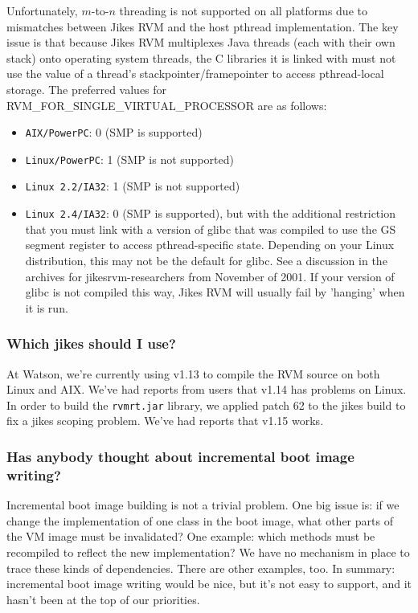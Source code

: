 Unfortunately, $m$-to-$n$ threading is not supported on all platforms due to
mismatches between Jikes RVM  and the host pthread implementation.  
The key issue is that because Jikes RVM multiplexes Java threads
(each with their own stack) onto operating system threads, the
C libraries it is linked with must not use the value of a thread's
stackpointer/framepointer to access pthread-local storage.  The
preferred values for RVM\_FOR\_SINGLE\_VIRTUAL\_PROCESSOR are as
follows: 
\begin{itemize}
\item {\tt AIX/PowerPC}: 0 (SMP is supported)
\item {\tt Linux/PowerPC}:  1 (SMP is not supported)
\item {\tt Linux 2.2/IA32}: 1 (SMP is not supported)
\item {\tt Linux 2.4/IA32}: 0 (SMP is supported), but with the
additional restriction that you must link with a version of glibc that
was compiled to use the GS segment register to access pthread-specific
state.  Depending on your Linux distribution, this may not be the
default for glibc. See a discussion in the archives for
jikesrvm-researchers from November of 2001. If your version of glibc
is not compiled this way, Jikes RVM  will usually fail by 'hanging' when
it is run.
\end{itemize}                

\subsubsection{Which jikes should I use?}
At Watson, we're currently using 
 v1.13 to compile the RVM source on
both Linux and AIX\AIXTMFootnote.  We've had reports from users that
v1.14 has problems 
on Linux.  In order to build the {\tt rvmrt.jar} library, we applied 
patch 62
to the jikes build to fix a jikes scoping problem.
We've had reports that v1.15 works.


\subsubsection{Has anybody thought about incremental boot image writing?}

Incremental boot image building is not a trivial problem.  One big
issue is: if we change the implementation of one class in the boot image,
what other parts of the VM image must be invalidated?  One example: which
methods must be recompiled to reflect the new implementation?  We have no
mechanism in place to trace these kinds of dependencies.  There are other
examples, too.  In summary: incremental boot image writing would be nice,
but it's not easy to support, and it hasn't been at the top of our
priorities.

